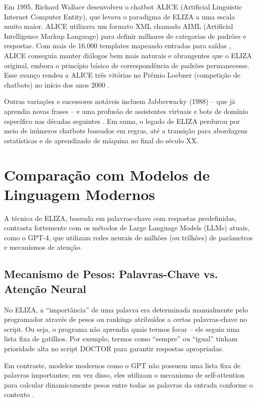 \documentclass[14pt,a4paper,oneside]{book}
\begin{document}
Em 1995, Richard Wallace desenvolveu o chatbot ALICE (Artificial Linguistic Internet Computer Entity), que levava o paradigma de ELIZA a uma escala muito maior. ALICE utilizava um formato XML chamado AIML (Artificial Intelligence Markup Language) para definir milhares de categorias de padrões e respostas. Com mais de 16.000 templates mapeando entradas para saídas \cite{Wallace2000}, ALICE conseguia manter diálogos bem mais naturais e abrangentes que o ELIZA original, embora o princípio básico de correspondência de padrões permanecesse. Esse avanço rendeu a ALICE três vitórias no Prêmio Loebner (competição de chatbots) no início dos anos 2000 \cite{Wallace2000}.

Outras variações e sucessores notáveis incluem Jabberwacky (1988) – que já aprendia novas frases – e uma profusão de assistentes virtuais e bots de domínio específico nas décadas seguintes \cite{Wallace2000}. Em suma, o legado de ELIZA perdurou por meio de inúmeros chatbots baseados em regras, até a transição para abordagens estatísticas e de aprendizado de máquina no final do século XX.

\section{Comparação com Modelos de Linguagem Modernos}

A técnica de ELIZA, baseada em palavras-chave com respostas predefinidas, contrasta fortemente com os métodos de Large Language Models (LLMs) atuais, como o GPT-4, que utilizam redes neurais de milhões (ou trilhões) de parâmetros e mecanismos de atenção.

\subsection{Mecanismo de Pesos: Palavras-Chave vs. Atenção Neural}

No ELIZA, a “importância” de uma palavra era determinada manualmente pelo programador através de pesos ou rankings atribuídos a certas palavras-chave no script. Ou seja, o programa não aprendia quais termos focar – ele seguia uma lista fixa de gatilhos. Por exemplo, termos como “sempre” ou “igual” tinham prioridade alta no script DOCTOR para garantir respostas apropriadas.

Em contraste, modelos modernos como o GPT não possuem uma lista fixa de palavras importantes; em vez disso, eles utilizam o mecanismo de self-attention para calcular dinamicamente pesos entre todas as palavras da entrada conforme o contexto \cite{Vaswani2017}.
\end{document}
